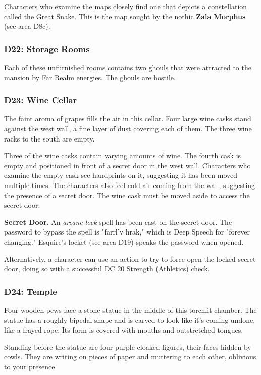 \documentclass[10pt,a4paper,twoside,bg=print,twocolumn,openany,nodeprecatedcode]{dndbook}
\begin{document}
Characters who examine the maps closely find one that depicts a constellation called the Great Snake. This is the map sought by the nothic \textbf{Zala Morphus} (see area D8c).

\subsubsection{D22: Storage Rooms}
Each of these unfurnished rooms contains two ghouls that were attracted to the mansion by Far Realm energies. The ghouls are hostile.

\subsubsection{D23: Wine Cellar}
\begin{DndReadAloud}{}
The faint aroma of grapes fills the air in this cellar. Four large wine casks stand against the west wall, a fine layer of dust covering each of them. The three wine racks to the south are empty.

\end{DndReadAloud}

Three of the wine casks contain varying amounts of wine. The fourth cask is empty and positioned in front of a secret door in the west wall. Characters who examine the empty cask see handprints on it, suggesting it has been moved multiple times. The characters also feel cold air coming from the wall, suggesting the presence of a secret door. The wine cask must be moved aside to access the secret door.

\textbf{Secret Door}. An \textit{arcane lock} spell has been cast on the secret door. The password to bypass the spell is "farrl'v hrak," which is Deep Speech for "forever changing." Esquire's locket (see area D19) speaks the password when opened.

Alternatively, a character can use an action to try to force open the locked secret door, doing so with a successful DC 20 Strength (Athletics) check.

\subsubsection{D24: Temple}
\begin{DndReadAloud}{}
Four wooden pews face a stone statue in the middle of this torchlit chamber. The statue has a roughly bipedal shape and is carved to look like it's coming undone, like a frayed rope. Its form is covered with mouths and outstretched tongues.

Standing before the statue are four purple-cloaked figures, their faces hidden by cowls. They are writing on pieces of paper and muttering to each other, oblivious to your presence.

\end{DndReadAloud}
\end{document}
